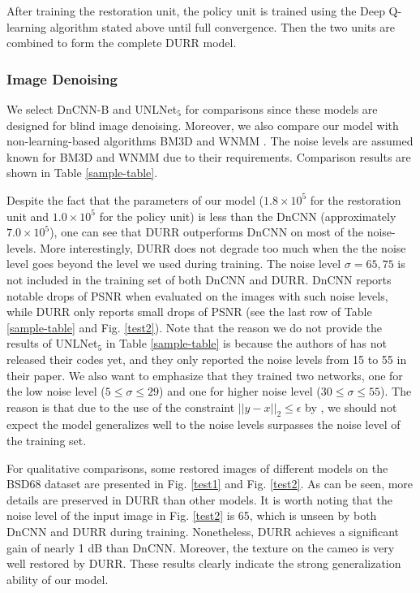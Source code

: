 \documentclass{article} %
\begin{document}
After training the restoration unit, the policy unit is trained
using the Deep Q-learning algorithm stated above until
full convergence. Then the two units are combined to form
the complete DURR model.

\subsubsection{Image Denoising}

We select DnCNN-B\citep{zhang2017beyond} and UNLNet$_5$
\citep{lefkimmiatis2017universal} for comparisons
since these models are designed for blind image denoising. Moreover,
we also compare our model with non-learning-based algorithms
BM3D \citep{dabov2007image} and WNMM \citep{gu2014weighted}.
The noise levels are assumed known for BM3D and WNMM due to their requirements.
Comparison results are shown in Table \ref{sample-table}.

Despite the fact that the parameters of our model ($1.8\times10^5$ for
the restoration unit and $1.0\times10^5$ for the policy unit) is less than
the DnCNN (approximately $7.0\times10^5$), one can see that DURR outperforms
DnCNN on most of the noise-levels.
More interestingly, DURR does not degrade too much when the the noise level
goes beyond the level we used during training. The noise level $\sigma=65, 75$
is not included in the training set of both DnCNN and DURR. DnCNN reports
notable drops of PSNR when evaluated on the images with such noise levels,
while DURR only reports small drops of PSNR (see the last row of
Table \ref{sample-table} and Fig. \ref{test2}). Note that
the reason we do not provide the results of UNLNet$_5$ in
Table \ref{sample-table} is because the authors of
\cite{lefkimmiatis2017universal} has not released their codes yet,
and they only reported the noise levels from 15 to 55 in their paper.
We also want to emphasize that they trained two networks, one for
the low noise level ($5\le\sigma\le29$) and one for
higher noise level ($30\le\sigma\le55$). The reason is that
due to the use of the constraint $||y-x||_2\le \epsilon$ by
\cite{lefkimmiatis2017universal}, we should not expect the model
generalizes well to the noise levels surpasses the noise level of
the training set.

For qualitative comparisons, some restored images of different models
on the BSD68 dataset are presented in Fig. \ref{test1} and Fig. \ref{test2}.
As can be seen, more details are preserved in DURR than other models.
It is worth noting that the noise level of the input image in Fig. \ref{test2}
is 65, which is unseen by both DnCNN and DURR during training. Nonetheless, DURR achieves
a significant gain of nearly 1 dB than DnCNN. Moreover, the texture on
the cameo is very well restored by DURR. These results clearly
indicate the strong generalization ability of our model.
\end{document}
